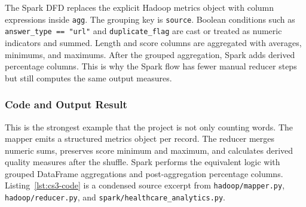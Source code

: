 \documentclass[12pt,a4paper]{article}
\begin{document}
The Spark DFD replaces the explicit Hadoop metrics object with column expressions inside \texttt{agg}. The grouping key is \texttt{source}. Boolean conditions such as \texttt{answer\_type == "url"} and \texttt{duplicate\_flag} are cast or treated as numeric indicators and summed. Length and score columns are aggregated with averages, minimums, and maximums. After the grouped aggregation, Spark adds derived percentage columns. This is why the Spark flow has fewer manual reducer steps but still computes the same output measures.

\subsubsection*{Code and Output Result}

This is the strongest example that the project is not only counting words. The mapper emits a structured metrics object per record. The reducer merges numeric sums, preserves score minimum and maximum, and calculates derived quality measures after the shuffle. Spark performs the equivalent logic with grouped DataFrame aggregations and post-aggregation percentage columns. Listing~\ref{lst:cs3-code} is a condensed source excerpt from \texttt{hadoop/mapper.py}, \texttt{hadoop/reducer.py}, and \texttt{spark/healthcare\_analytics.py}.
\end{document}
